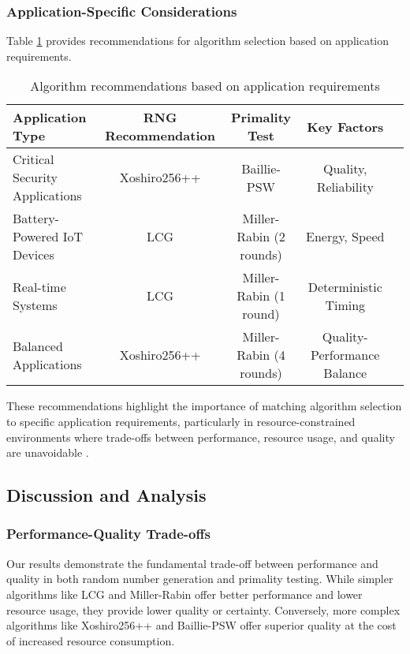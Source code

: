 \subsubsection{Application-Specific Considerations}
Table \ref{tab:application_considerations} provides recommendations for algorithm selection based on application requirements.

\begin{table}[h]
\centering
\begin{tabular}{|l|c|c|c|c|}
\hline
\textbf{Application Type} & \textbf{RNG Recommendation} & \textbf{Primality Test} & \textbf{Key Factors} \\
\hline
Critical Security Applications & Xoshiro256++ & Baillie-PSW & Quality, Reliability \\
Battery-Powered IoT Devices & LCG & Miller-Rabin (2 rounds) & Energy, Speed \\
Real-time Systems & LCG & Miller-Rabin (1 round) & Deterministic Timing \\
Balanced Applications & Xoshiro256++ & Miller-Rabin (4 rounds) & Quality-Performance Balance \\
\hline
\end{tabular}
\caption{Algorithm recommendations based on application requirements}
\label{tab:application_considerations}
\end{table}

These recommendations highlight the importance of matching algorithm selection to specific application requirements, particularly in resource-constrained environments where trade-offs between performance, resource usage, and quality are unavoidable \cite{iot_survey, energy_efficient}.

\subsection{Discussion and Analysis}

\subsubsection{Performance-Quality Trade-offs}
Our results demonstrate the fundamental trade-off between performance and quality in both random number generation and primality testing. While simpler algorithms like LCG and Miller-Rabin offer better performance and lower resource usage, they provide lower quality or certainty. Conversely, more complex algorithms like Xoshiro256++ and Baillie-PSW offer superior quality at the cost of increased resource consumption.

